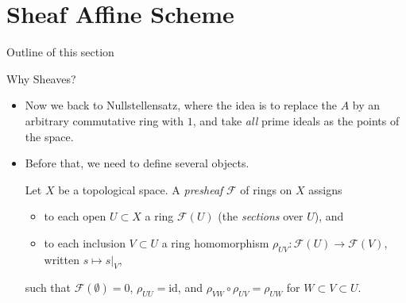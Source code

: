 \documentclass[8pt]{beamer}
\newcommand{\FF}{\mathcal{F}}
\theoremstyle{definition}
\begin{document}
    \section{Sheaf \text{\&} Affine Scheme}

    \begin{frame}{Outline of this section}
        
    \end{frame}

    \begin{frame}{Why Sheaves?}
        \begin{itemize}
            \item Now we back to Nullstellensatz, where the idea is to replace the $A$ by an arbitrary commutative ring with $1$, and take \emph{all} prime ideals as the points of the space. 
            \item Before that, we need to define several objects.
            
            \begin{definition}[Presheaf]
            Let $X$ be a topological space. A \emph{presheaf} $\FF$ of rings on $X$ assigns
            \begin{itemize}
                \item to each open $U \subset X$ a ring $\FF(U)$ (the \emph{sections} over $U$), and
                \item to each inclusion $V \subset U$ a ring homomorphism $\rho_{UV} \colon \FF(U) \to \FF(V)$, written $s \mapsto s|_V$,
            \end{itemize}
            such that $\FF(\emptyset) = 0$, $\rho_{UU} = \text{id}$, and $\rho_{VW} \circ \rho_{UV} = \rho_{UW}$ for $W \subset V \subset U$.
        \end{definition}
        \end{itemize}
        
    \end{frame}
\end{document}
